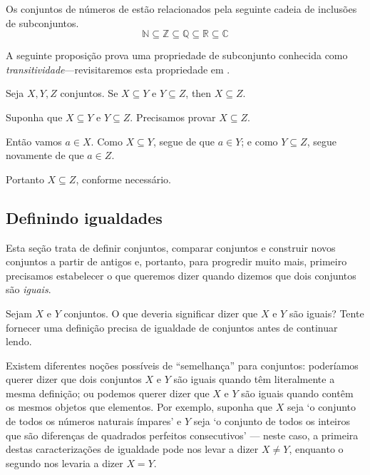 \begin{example}
Os conjuntos de números de  estão relacionados pela seguinte cadeia de inclusões de subconjuntos.
\[ \mathbb{N} \subseteq \mathbb{Z} \subseteq \mathbb{Q} \subseteq \mathbb{R} \subseteq \mathbb{C} \]
\end{example}

A seguinte proposição prova uma propriedade de subconjunto conhecida como \textit{transitividade}---revisitaremos esta propriedade em .

\begin{proposition}
\label{propSubsetTransitive}
Seja $X,Y,Z$ conjuntos. Se $X \subseteq Y$ e $Y \subseteq Z$, then $X \subseteq Z$.
\end{proposition}

\begin{cproof}
Suponha que $X \subseteq Y$ e $Y \subseteq Z$. Precisamos provar $X \subseteq Z$.

Então vamos $a \in X$. Como $X \subseteq Y$, segue de  que $a \in Y$; e como $Y \subseteq Z$, segue novamente de  que $a \in Z$.

Portanto $X \subseteq Z$, conforme necessário.
\end{cproof}

\subsection*{Definindo igualdades}

Esta seção trata de definir conjuntos, comparar conjuntos e construir novos conjuntos a partir de antigos e, portanto, para progredir muito mais, primeiro precisamos estabelecer o que queremos dizer quando dizemos que dois conjuntos são \textit{iguais}.

\begin{discussion}
\label{dscSetEquality}
Sejam $X$ e $Y$ conjuntos. O que deveria significar dizer que $X$ e $Y$ são iguais? Tente fornecer uma definição precisa de igualdade de conjuntos antes de continuar lendo.
\end{discussion}

Existem diferentes noções possíveis de “semelhança” para conjuntos: poderíamos querer dizer que dois conjuntos $X$ e $Y$ são iguais quando têm literalmente a mesma definição; ou podemos querer dizer que $X$ e $Y$ são iguais quando contêm os mesmos objetos que elementos. Por exemplo, suponha que $X$ seja `o conjunto de todos os números naturais ímpares' e $Y$ seja `o conjunto de todos os inteiros que são diferenças de quadrados perfeitos consecutivos' --- neste caso, a primeira destas caracterizações de igualdade pode nos levar a dizer $X \ne Y$, enquanto o segundo nos levaria a dizer $X = Y$.

